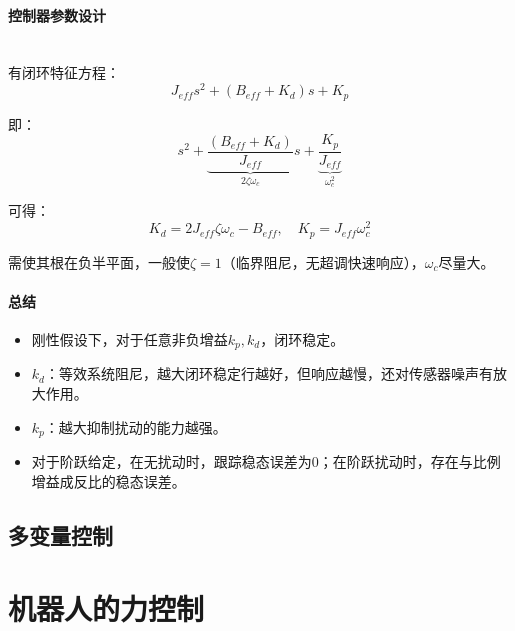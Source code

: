 \documentclass[
12pt, %
a4paper, 
oneside, %
headinclude,footinclude, %
]{scrartcl}
\begin{document}
\paragraph{控制器参数设计}~\\

有闭环特征方程：
$$ J_{eff}s^2 + (B_{eff} + K_d)s + K_p $$

即：
$$ s^2 + \underbrace{\frac{(B_{eff} + K_d)}{J_{eff}}}_{2\zeta \omega_c}s + \underbrace{\frac{K_p}{J_{eff}}}_{\omega_c^2} $$

可得：
$$ K_d = 2J_{eff}\zeta\omega_c - B_{eff}, \quad K_p = J_{eff}\omega_c^2 $$

需使其根在负半平面，一般使$ \zeta = 1 $（临界阻尼，无超调快速响应），$ \omega_c $尽量大。
\paragraph{总结}
\begin{itemize}
\item 刚性假设下，对于任意非负增益$ k_p, k_d $，闭环稳定。
\item $ k_d $：等效系统阻尼，越大闭环稳定行越好，但响应越慢，还对传感器噪声有放大作用。
\item $ k_p $：越大抑制扰动的能力越强。
\item 对于阶跃给定，在无扰动时，跟踪稳态误差为$ 0 $；在阶跃扰动时，存在与比例增益成反比的稳态误差。
\end{itemize}
\subsection[多变量控制]{多变量控制}
\section{机器人的力控制}
\end{document}
